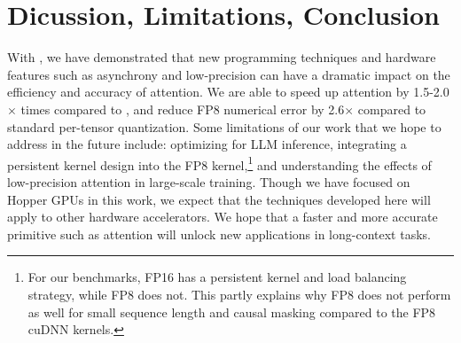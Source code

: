 \section{Dicussion, Limitations, Conclusion}
\label{sec:discussion}

With \fat, we have demonstrated that new programming techniques and hardware
features such as asynchrony and low-precision can have a dramatic impact on the
efficiency and accuracy of attention.
We are able to speed up attention by 1.5-2.0$\times$ times compared to \faa, and
reduce FP8 numerical error by 2.6$\times$ compared to standard per-tensor quantization.
Some limitations of our work that we hope to address in the future include: optimizing for
LLM inference, integrating a persistent kernel design into the FP8 kernel,\footnote{For our benchmarks, FP16 \fat has a persistent kernel and load balancing strategy, while FP8 \fat does not. This partly explains why FP8 \fat does not perform as well for small sequence length and causal masking compared to the FP8 cuDNN kernels.} and understanding the effects of low-precision attention in
large-scale training.
Though we have focused on Hopper GPUs in this work, we expect that the
techniques developed here will apply to other hardware accelerators.
We hope that a faster and more accurate primitive such as attention will unlock
new applications in long-context tasks.
